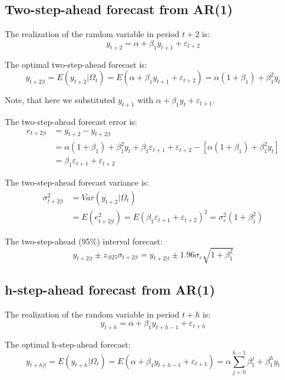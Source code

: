 \documentclass[
  oneside]{book}
\begin{document}
\hypertarget{two-step-ahead-forecast-from-ar1}{%
\subsection{Two-step-ahead forecast from AR(1)}\label{two-step-ahead-forecast-from-ar1}}

The realization of the random variable in period \(t+2\) is: \[y_{t+2} = \alpha + \beta_1 y_{t+1} + \varepsilon_{t+2}\]

The optimal two-step-ahead forecast is: \[y_{t+2|t} = E(y_{t+2}|\Omega_t) = E(\alpha + \beta_1 y_{t+1} + \varepsilon_{t+2}) = \alpha(1+\beta_1) + \beta_1^2 y_t\]

Note, that here we substituted \(y_{t+1}\) with \(\alpha + \beta_1 y_t + \varepsilon_{t+1}\).

The two-step-ahead forecast error is:
\[\begin{aligned}
e_{t+2|t} &= y_{t+2} - y_{t+2|t} \\
&= \alpha(1+\beta_1) + \beta_1^2 y_t + \beta_1\varepsilon_{t+1} + \varepsilon_{t+2} - [\alpha(1+\beta_1) + \beta_1^2 y_t] \\
&= \beta_1\varepsilon_{t+1} + \varepsilon_{t+2}
\end{aligned}\]

The two-step-ahead forecast variance is:
\[\begin{aligned}
\sigma_{t+2|t}^2 &= Var(y_{t+2}|\Omega_t) \\
&= E(e_{t+2|t}^2) = E(\beta_1\varepsilon_{t+1} + \varepsilon_{t+2})^2 = \sigma_{\varepsilon}^2(1+\beta_1^2)
\end{aligned}\]

The two-step-ahead (95\%) interval forecast: \[y_{t+2|t} \pm z_{.025}\sigma_{t+2|t} = y_{t+2|t} \pm 1.96\sigma_{\varepsilon}\sqrt{1+\beta_1^2}\]

\hypertarget{h-step-ahead-forecast-from-ar1}{%
\subsection{h-step-ahead forecast from AR(1)}\label{h-step-ahead-forecast-from-ar1}}

The realization of the random variable in period \(t+h\) is: \[y_{t+h} = \alpha + \beta_1 y_{t+h-1} + \varepsilon_{t+h}\]

The optimal h-step-ahead forecast: \[y_{t+h|t} = E(y_{t+h}|\Omega_t) = E(\alpha + \beta_1 y_{t+h-1} + \varepsilon_{t+1}) = \alpha\textstyle\sum_{j=0}^{h-1}\beta_1^j + \beta_1^h y_t\]
\end{document}
